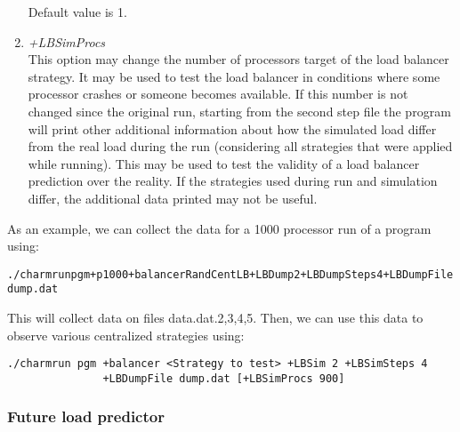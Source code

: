 \begin{enumerate}
	Default value is 1.
\item {\em +LBSimProcs}\\
        This option may change the number of processors target of the load balancer strategy. It may be used to test
	the load balancer in conditions where some processor crashes or someone becomes available. If this number is not
	changed since the original run, starting from the second step file the program will print other additional
	information about how the simulated load differ from the real load during the run (considering all
	strategies that were applied while running). This may be used to test the validity of a load balancer
	prediction over the reality. If the strategies used during run and simulation differ, the additional data
	printed may not be useful.
\end{enumerate}
As an example, we can collect the data for a 1000 processor run of a program using:
\begin{alltt}
./charmrun pgm +p 1000 +balancer RandCentLB +LBDump 2 +LBDumpSteps 4 +LBDumpFile dump.dat
\end{alltt}
This will collect data on files data.dat.{2,3,4,5}. Then, we can use this data to observe various centralized strategies using:
\begin{verbatim}
./charmrun pgm +balancer <Strategy to test> +LBSim 2 +LBSimSteps 4 
               +LBDumpFile dump.dat [+LBSimProcs 900]
\end{verbatim}

\subsubsection{Future load predictor}

